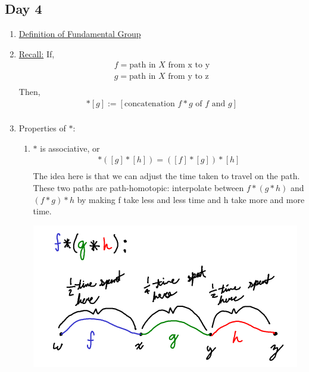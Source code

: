 \subsection{Day 4}
    \begin{enumerate}
        \item\underline{Definition of Fundamental Group}
        \item \underline{Recall:} If,
            \begin{align*}
                f=\text{path in $X$ from x to y}\\
                g=\text{path in $X$ from y to z}\\
            \end{align*}
            Then,
            \begin{align*}
                [f]*[g]:=[\text{concatenation $f*g$ of $f$ and $g$}]\\
            \end{align*}
        \item{Properties of $*$:}
            \begin{enumerate}
                \item $*$ is associative, or
                    \begin{align*}
                        [f]*([g]*[h])=([f]*[g])*[h]\\
                    \end{align*}
                    The idea here is that we can adjust the time taken to travel on the path.
                    These two paths are path-homotopic: interpolate between $f*(g*h)$ and
                    $(f*g)*h$ by making f take less and less time and h take more and more time.\\
            \begin{minipage}[c]{\linewidth}
                \begin{center}
                \includegraphics[]{images/association.png}

\end{center}
\end{minipage}
\end{enumerate}
\end{enumerate}
